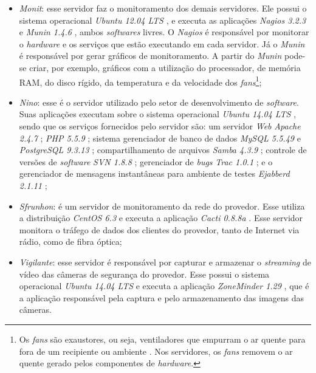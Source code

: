 \begin{itemize}
 \item \textit{Monit}: esse servidor faz o monitoramento dos demais servidores. Ele possui o sistema operacional \textit{Ubuntu 12.04 \ac{LTS}} 
 \cite{ubuntu}, e executa as aplicações \textit{Nagios 3.2.3} \cite{nagios} e \textit{Munin 1.4.6} \cite{munin}, ambos \textit{softwares} livres. 
 O \textit{Nagios} é responsável por monitorar o \textit{hardware} e os serviços que estão executando em cada servidor. Já o \textit{Munin} é 
 responsável por gerar gráficos de monitoramento. A partir do \textit{Munin} pode-se criar, por exemplo, gráficos com a utilização do processador,
 de memória \ac{RAM}, do disco rígido, da temperatura e da velocidade dos \textit{fans}\footnote[3]{Os \textit{fans} são exaustores, ou seja, 
 ventiladores que empurram o ar quente para fora de um recipiente ou ambiente \cite{ats2012}. Nos servidores, os \textit{fans} removem o ar quente 
 gerado pelos componentes de \textit{hardware}.};
 
 \item \textit{Nino}: esse é o servidor utilizado pelo setor de desenvolvimento de \textit{software}. Suas aplicações executam sobre o sistema 
 operacional \textit{Ubuntu 14.04 \ac{LTS}} \cite{ubuntu}, sendo que os serviços fornecidos pelo servidor são: um servidor \textit{Web} 
 \textit{Apache 2.4.7} \cite{apache}; \textit{\ac{PHP} 5.5.9} \cite{php}; sistema gerenciador de banco de dados \textit{MySQL 5.5.49} \cite{mysql} 
 e \textit{PostgreSQL 9.3.13} \cite{postgres}; compartilhamento de arquivos \textit{Samba 4.3.9} \cite{samba}; controle de versões de 
 \textit{software} \textit{\ac{SVN} 1.8.8} \cite{svn}; gerenciador de \textit{bugs} \textit{Trac 1.0.1} \cite{trac}; e o gerenciador de 
 mensagens instantâneas para ambiente de testes \textit{Ejabberd 2.1.11} \cite{ejabberd};
 
 \item \textit{Sfrunhon}: é um servidor de monitoramento da rede do provedor. Esse utiliza a distribuição \textit{CentOS 6.3} \cite{centos} e 
 executa a aplicação \textit{Cacti 0.8.8a} \cite{cacti}. Esse servidor monitora o tráfego de dados dos clientes do provedor, tanto de Internet 
 via rádio, como de fibra óptica;
 
 \item \textit{Vigilante}: esse servidor é responsável por capturar e armazenar o \textit{streaming} de vídeo das câmeras de segurança do provedor. 
 Esse possui o sistema operacional \textit{Ubuntu 14.04 \ac{LTS}} \cite{ubuntu} e executa a aplicação \textit{ZoneMinder 1.29} \cite{zoneminder}, 
 que é a aplicação responsável pela captura e pelo armazenamento das imagens das câmeras.
\end{itemize}

